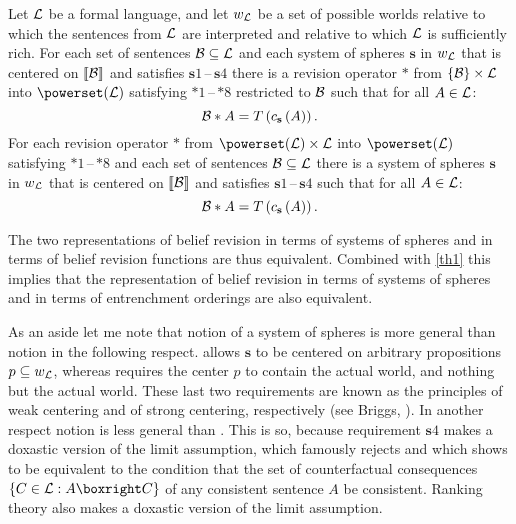 \begin{theorem}\label{th2}
Let $\cal L$ be a formal language, and let $w_{\cal L}$ be a set of possible worlds relative to which the sentences from $\cal L$ are interpreted and relative to which $\cal L$ is sufficiently rich. For each set of sentences $\cal B\subseteq L$ and each system of spheres $\textbf{s}$ in $w_{\cal L}$ that is centered on $\llbracket\cal B\rrbracket$ and satisfies $\textbf{s}1$\,--\,$\textbf{s}4$ there is a revision operator $*$ from $\left\{\cal B\right\}\times\cal L$ into $\powerset\!\left(\cal L\right)$ satisfying $*1$\,--\,$*8$ restricted to $\cal B$ such that for all $A\in\cal L$:
$$\begin{cal}B\end{cal}*A=T\left(c_{\textbf{s}}\left(A\right)\right).$$
For each revision operator $*$ from $\powerset\!\left(\cal L\right)\times\cal L$ into $\powerset\!\left(\cal L\right)$ satisfying $*1$\,--\,$*8$ and each set of sentences $\cal B\subseteq L$ there is a system of spheres $\textbf{s}$ in $w_{\cal L}$ that is centered on $\llbracket\cal B\rrbracket$ and satisfies $\textbf{s}1$\,--\,$\textbf{s}4$ such that for all $A\in\cal L$:
$$\begin{cal}B\end{cal}*A=T\left(c_{\textbf{s}}\left(A\right)\right).$$
\end{theorem}
The two representations of belief revision in terms of systems of spheres and in terms of belief revision functions are thus equivalent. Combined with \autoref{th1} this implies that the representation of belief revision in terms of systems of spheres and in terms of entrenchment orderings are also equivalent.%

As an aside let me note that  notion of a system of spheres is more general than  notion in the following respect. \citet{g88} allows $\textbf{s}$ to be centered on arbitrary propositions $p\subseteq w_{\cal L}$, whereas \citet[14f]{l73} requires the center $p$ to contain the actual world, and nothing but the actual world. These last two requirements are known as the principles of weak centering and of strong centering, respectively (see Briggs, ). In another respect  notion is less general than . This is so, because requirement $\textbf{s}4$ makes a doxastic version of the limit assumption, which \citet[19f]{l73} famously rejects and which \citet{h79} shows to be equivalent to the condition that the set of counterfactual consequences $\{C\in\begin{cal}L\end{cal}:A\boxright C\}$ of any consistent sentence $A$ be consistent. Ranking theory also makes a doxastic version of the limit assumption.

